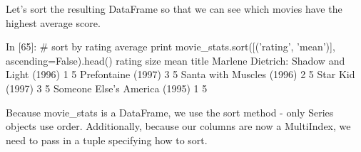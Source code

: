 Let's sort the resulting DataFrame so that we can see which movies have the highest average score.

In [65]:
# sort by rating average
print movie_stats.sort([('rating', 'mean')], ascending=False).head()
                                            rating      
                                              size  mean
title                                                   
Marlene Dietrich: Shadow and Light (1996)        1     5
Prefontaine (1997)                               3     5
Santa with Muscles (1996)                        2     5
Star Kid (1997)                                  3     5
Someone Else's America (1995)                    1     5

Because movie_stats is a DataFrame, we use the sort method - only Series objects use order. Additionally, because our columns are now a MultiIndex, we need to pass in a tuple specifying how to sort.

